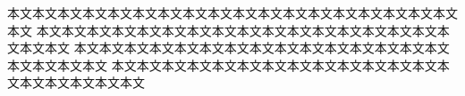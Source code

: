 \documentclass{mta}
\begin{document}
本文本文本文本文本文本文本文本文本文本文本文本文本文本文本文本文本文本文本文
本文本文本文本文本文本文本文本文本文本文本文本文本文本文本文本文本文本文本文
本文本文本文本文本文本文本文本文本文本文本文本文本文本文本文本文本文本文本文
本文本文本文本文本文本文本文本文本文本文本文本文本文本文本文本文本文本文本文

%
%
\end{document}
